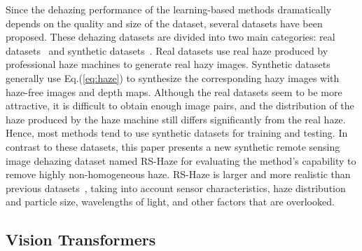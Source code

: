 \documentclass[journal]{IEEEtran}
\begin{document}
Since the dehazing performance of the learning-based methods dramatically depends on the quality and size of the dataset, several datasets have been proposed.
These dehazing datasets are divided into two main categories: real datasets~\cite{ancuti2018haze,ancuti2018haze2,ancuti2019dense,ancuti2020nh} and synthetic datasets~\cite{ancuti2016d,zhang2017hazerd,li2018benchmarking}.
Real datasets use real haze produced by professional haze machines to generate real hazy images.
Synthetic datasets generally use Eq.(\ref{eq:haze}) to synthesize the corresponding hazy images with haze-free images and depth maps.
Although the real datasets seem to be more attractive, it is difficult to obtain enough image pairs, and the distribution of the haze produced by the haze machine still differs significantly from the real haze. 
Hence, most methods tend to use synthetic datasets for training and testing.
In contrast to these datasets, this paper presents a new synthetic remote sensing image dehazing dataset named RS-Haze for evaluating the method's capability to remove highly non-homogeneous haze.
RS-Haze is larger and more realistic than previous datasets~\cite{qin2018dehazing,guo2020rsdehazenet,huang2020single,mehta2021domain}, taking into account sensor characteristics, haze distribution and particle size, wavelengths of light, and other factors that are overlooked.

\subsection{Vision Transformers}
\end{document}
